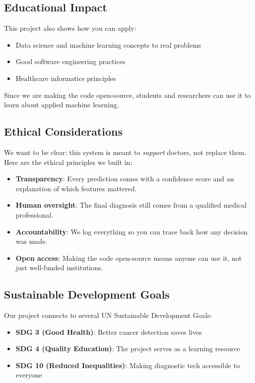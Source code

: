 \documentclass[12pt]{article}
\begin{document}
\subsection{Educational Impact}

This project also shows how you can apply:
\begin{itemize}
    \item Data science and machine learning concepts to real problems
    \item Good software engineering practices
    \item Healthcare informatics principles
\end{itemize}

Since we are making the code open-source, students and researchers can use it to learn about applied machine learning.

\subsection{Ethical Considerations}

We want to be clear: this system is meant to \textit{support} doctors, not replace them. Here are the ethical principles we built in:

\begin{itemize}
    \item \textbf{Transparency}: Every prediction comes with a confidence score and an explanation of which features mattered.
    \item \textbf{Human oversight}: The final diagnosis still comes from a qualified medical professional.
    \item \textbf{Accountability}: We log everything so you can trace back how any decision was made.
    \item \textbf{Open access}: Making the code open-source means anyone can use it, not just well-funded institutions.
\end{itemize}

\subsection{Sustainable Development Goals}

Our project connects to several UN Sustainable Development Goals:
\begin{itemize}
    \item \textbf{SDG 3 (Good Health)}: Better cancer detection saves lives
    \item \textbf{SDG 4 (Quality Education)}: The project serves as a learning resource
    \item \textbf{SDG 10 (Reduced Inequalities)}: Making diagnostic tech accessible to everyone
\end{itemize}
\end{document}
